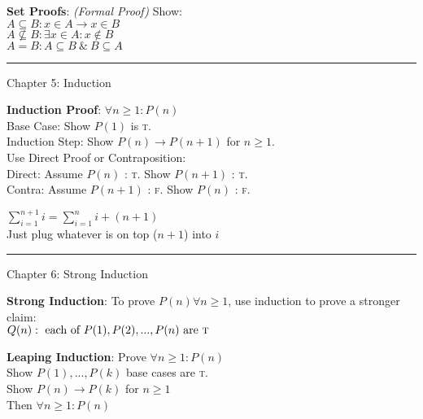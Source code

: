 \documentclass[12pt, letterpaper]{article}
\begin{document}
\begin{multicols}{2}
\textbf{Set Proofs}: \textit{(Formal Proof)} Show: \\
\null \quad $A \subseteq B : x \in A \rightarrow x \in B$ \\
\null \quad $A \nsubseteq B : \exists x \in A : x \notin B$ \\
\null \quad $A = B : A \subseteq B \ \& \ B \subseteq A$

\rule[0.5ex]{\linewidth}{1pt}

Chapter 5: Induction

\textbf{Induction Proof}: $\forall n \geq 1 : P(n)$ \\
  Base Case: Show $P(1)$ is \textsc{t}. \\
  Induction Step: Show $P(n) \rightarrow P(n + 1)$ for $n \geq 1$. \\
  \null \quad Use Direct Proof or Contraposition: \\
  \null \qquad Direct: Assume $P(n)$ : \textsc{t}. Show $P(n + 1)$ : \textsc{t}. \\
  \null \qquad Contra: Assume $P(n + 1)$ : \textsc{f}. Show $P(n)$ : \textsc{f}.

$\sum_{i=1}^{n+1}i = \sum_{i=1}^{n}i + (n + 1)$ \\
Just plug whatever is on top ($n + 1$) into $i$

\rule[0.5ex]{\linewidth}{1pt}

Chapter 6: Strong Induction

\textbf{Strong Induction}: To prove $P(n) \forall n \geq 1$, use induction to prove
a stronger claim: \\
\null \quad $Q(n) : \ \text{each of}\ P(1), P(2),..., P(n) \text{ are \textsc{t} }$

\textbf{Leaping Induction}: Prove $\forall n \geq 1 : P(n)$ \\
\null \quad Show $P(1),...,P(k)$ base cases are \textsc{t}. \\
\null \quad Show $P(n) \rightarrow P(k)$ for $n \geq 1$ \\
\null \quad Then $\forall n \geq 1 : P(n)$
\end{multicols}
\end{document}
